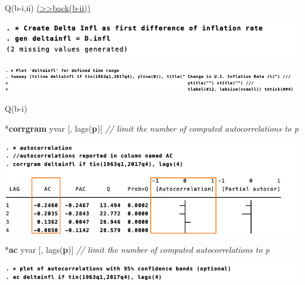\documentclass[
  10pt,
  ignorenonframetext,
]{beamer}
\newenvironment{Shaded}{\begin{snugshade}}{\end{snugshade}}
\newcommand{\CommentTok}[1]{\textcolor[rgb]{0.56,0.35,0.01}{\textit{#1}}}
\newcommand{\KeywordTok}[1]{\textcolor[rgb]{0.13,0.29,0.53}{\textbf{#1}}}
\newcommand{\NormalTok}[1]{#1}
\begin{document}
\begin{frame}{Q(b-i,ii)
\footnotesize \protect\hyperlink{Plot-infl-A}{(\textgreater\textgreater back(b-ii))}
\normalsize }
\protect\hypertarget{Plot-deltainfl}{}
\begin{flushleft}\includegraphics[width=0.8\linewidth]{pictures/(b-i)deltainfl} \end{flushleft}

\vspace{3mm}

\begin{flushleft}\includegraphics[width=1\linewidth]{pictures/(b-iii)Plot-deltainfl} \end{flushleft}
\end{frame}

\begin{frame}[fragile]{Q(b-i)}
\protect\hypertarget{qb-i}{}
\small

\begin{Shaded}
\begin{Highlighting}[]
\NormalTok{*}\KeywordTok{corrgram}\NormalTok{ yvar [, lags(}\KeywordTok{p}\NormalTok{)]}
\CommentTok{// limit the number of computed autocorrelations to p}
\end{Highlighting}
\end{Shaded}

\begin{flushleft}\includegraphics[width=1\linewidth]{pictures/(b-i)corrgram} \end{flushleft}

\small

\begin{Shaded}
\begin{Highlighting}[]
\NormalTok{*}\KeywordTok{ac}\NormalTok{ yvar [, lags(}\KeywordTok{p}\NormalTok{)]}
\CommentTok{// limit the number of computed autocorrelations to p}
\end{Highlighting}
\end{Shaded}

\begin{flushleft}\includegraphics[width=1\linewidth]{pictures/(b-i)ac} \end{flushleft}
\end{frame}
\end{document}

